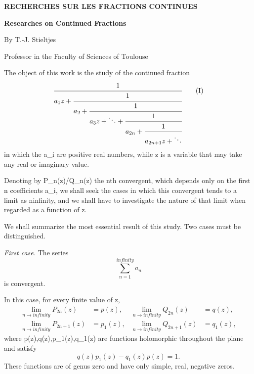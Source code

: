 \documentclass[
  paper=b5,
  fontsize=13pt,
  twoside,
  headings=normal,
  bookmarkpackage=false
]{scrartcl}
\theoremstyle{stieltjesplain}
\theoremstyle{stieltjesdefinition}
\def\({}\def\){}%
\def\infty{infinity}%
\begin{document}
\setcounter{page}{1}

\thispagestyle{empty}
\begin{center}
  {\Large\bfseries RECHERCHES SUR LES FRACTIONS CONTINUES\par}
  \vspace{0.35em}
  {\LARGE\bfseries Researches on Continued Fractions\par}
  \vspace{0.8em}
  {\large By T.-J. Stieltjes\par}
  \vspace{0.2em}
  {\normalsize Professor in the Faculty of Sciences of Toulouse\par}
\end{center}


The object of this work is the study of the continued fraction
\begin{equation}
 \cfrac{1}{a_1z+
  \cfrac{1}{a_2+
   \cfrac{1}{a_3z+\ddots+
    \cfrac{1}{a_{2n}+
     \cfrac{1}{a_{2n+1}z+\ddots}}}}}
 \tag{I}\label{eq:intro-I}
\end{equation}
in which the \(a_i\) are positive real numbers, while \(z\) is a variable
that may take any real or imaginary value.

Denoting by \(P_n(z)/Q_n(z)\) the \(n\)th convergent, which depends only
on the first \(n\) coefficients \(a_i\), we shall seek the cases in which
this convergent tends to a limit as \(n\to\infty\), and we shall have to
investigate the nature of that limit when regarded as a function of \(z\).

We shall summarize the most essential result of this study. Two cases
must be distinguished.

\emph{First case.} The series
\[
 \sum_{n=1}^{\infty}a_n
\]
is convergent.

In this case, for every finite value of \(z\),
\begin{align*}
 \lim_{n\to\infty}P_{2n}(z)&=p(z),&
 \lim_{n\to\infty}Q_{2n}(z)&=q(z),\\
 \lim_{n\to\infty}P_{2n+1}(z)&=p_1(z),&
 \lim_{n\to\infty}Q_{2n+1}(z)&=q_1(z),
\end{align*}
where \(p(z),q(z),p_1(z),q_1(z)\) are functions holomorphic throughout
the plane and satisfy
\[
 q(z)p_1(z)-q_1(z)p(z)=1.
\]
These functions are of genus zero and have only simple, real, negative
zeros.
\end{document}
